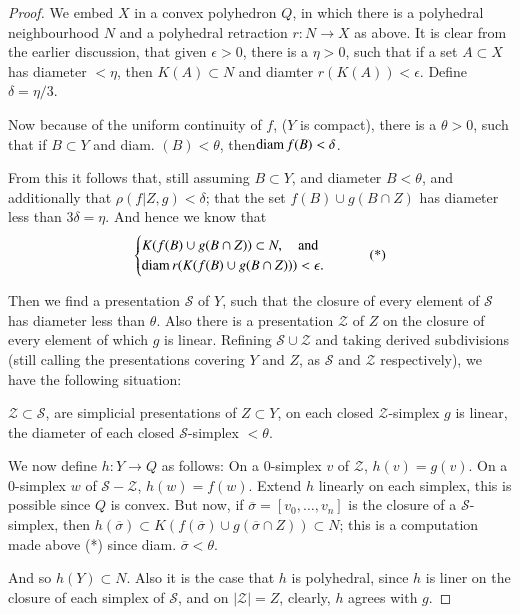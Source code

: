 \begin{proof}
We embed $X$ in a convex polyhedron $Q$, in which there is a polyhedral neighbourhood $N$ and a polyhedral retraction $r:N\to X$ as above. It is clear from the earlier discussion, that given $\epsilon>0$, there is a $\eta>0$, such that if a set $A\subset X$ has diameter $<\eta$, then $K(A)\subset N$ and diamter $r(K(A))<\epsilon$. Define $\delta=\eta/3$.


Now because of the uniform continuity of $f$, ($Y$ is compact), there is a $\theta>0$, such that if $B\subset Y$ and diam. $(B)<\theta$, then\pageoriginale $\operatorname{diam} f(B)<\delta$.

From this it follows that, still assuming $B\subset Y$, and diameter $B<\theta$, and additionally that $\rho(f|Z,g)<\delta$; that the set $f(B)\cup g(B\cap Z)$ has diameter less than $3\delta=\eta$. And hence we know that 
\begin{equation*}
\begin{cases}
K(f(B)\cup g(B\cap Z))\subset N,\quad\text{and}\\
\operatorname{diam} r(K(f(B)\cup g(B\cap Z)))<\epsilon.
\end{cases}\tag{*}
\end{equation*}

Then we find a presentation $\mathscr{S}$ of $Y$, such that the closure of every element of $\mathscr{S}$ has diameter less than $\theta$. Also there is a presentation $\mathscr{Z}$ of $Z$ on the closure of every element of which $g$ is linear. Refining $\mathscr{S}\cup \mathscr{Z}$ and taking derived subdivisions (still calling the presentations covering $Y$ and $Z$, as $\mathscr{S}$ and $\mathscr{Z}$ respectively), we have the following situation:

$\mathscr{Z}\subset \mathscr{S}$, are simplicial presentations of $Z\subset Y$, on each closed $\mathscr{Z}$-simplex $g$ is linear, the diameter of each closed $\mathscr{S}$-simplex $<\theta$.

We now define $h:Y\to Q$ as follows: On a $0$-simplex $v$ of $\mathscr{Z}$, $h(v)=g(v)$. On a $0$-simplex $w$ of $\mathscr{S}-\mathscr{Z}$, $h(w)=f(w)$. Extend $h$ linearly on each simplex, this is possible since $Q$ is convex. But now, if $\overline{\sigma}=[v_{0},\ldots,v_{n}]$ is the closure of a $\mathscr{S}$-simplex, then $h(\overline{\sigma})\subset K(f(\overline{\sigma})\cup g(\overline{\sigma}\cap Z))\subset N$; this is a computation made above (*) since diam. $\overline{\sigma}<\theta$.

And so $h(Y)\subset N$. Also it is the case that $h$ is polyhedral, since $h$ is liner on the closure of each simplex of $\mathscr{S}$, and on $|\mathscr{Z}|=Z$, clearly, $h$ agrees with $g$.


\end{proof}
